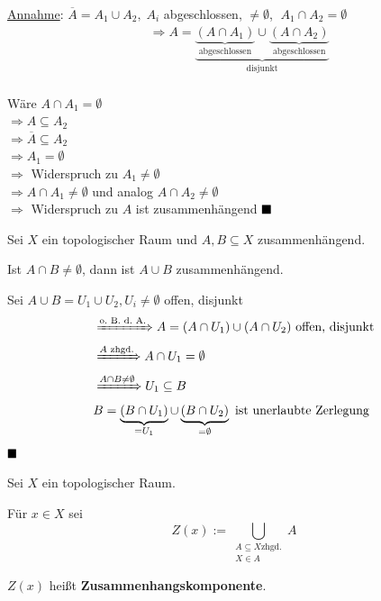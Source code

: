 \begin{beweis}
    \underline{Annahme}: $\overline{A} = A_1 \cup A_2,\; A_i$ abgeschlossen, $\neq \emptyset$,
    $\;A_1 \cap A_2 = \emptyset$
    \begin{align*}
        &\Rightarrow A = \underbrace{\underbrace{(A \cap A_1)}_\text{abgeschlossen} \cup \underbrace{(A \cap A_2)}_\text{abgeschlossen}}_\text{disjunkt}\\
    \end{align*}

    Wäre $A \cap A_1 = \emptyset$\\
    $\Rightarrow A \subseteq A_2$\\
    $\Rightarrow \overline{A} \subseteq A_2$\\
    $\Rightarrow A_1 = \emptyset$\\
    $\Rightarrow$ Widerspruch zu $A_1 \neq \emptyset$\\
    $\Rightarrow A \cap A_1 \neq \emptyset$ und analog 
                $A \cap A_2 \neq \emptyset$\\
    $\Rightarrow$ Widerspruch zu $A$ ist zusammenhängend $ \qed$
\end{beweis}

\begin{bemerkung}\label{bem:zusammenhangVereinigung}
    Sei $X$ ein topologischer Raum und $A, B \subseteq X$ zusammenhängend.

    Ist $A \cap B \neq \emptyset$, dann ist $A \cup B$ zusammenhängend.
\end{bemerkung}

\begin{beweis}
    Sei $A \cup B = U_1 \cup U_2, U_i \neq \emptyset$ offen, disjunkt
    \begin{align*}
        &\xRightarrow{\text{o.~B.~d.~A.}} A = (A \cap U_1) \cup (A \cap U_2) \text{ offen, disjunkt}\\
        &\xRightarrow{A \text{ zhgd.}} A \cap U_1 = \emptyset\\
        &\xRightarrow{A \cap B \neq \emptyset} U_1 \subseteq B\\
        &B = \underbrace{(B \cap U_1)}_{= U_1} \cup \underbrace{(B \cap U_2)}_{= \emptyset} \text{ ist unerlaubte Zerlegung}
    \end{align*}
    $\qed$
\end{beweis}

\begin{definition}
    Sei $X$ ein topologischer Raum.
    
    Für $x \in X$ sei 
    \[Z(x) := \bigcup_{\substack{A \subseteq X \text{zhgd.}\\ X \in A}} A\]

     $Z(x)$ heißt \textbf{Zusammenhangskomponente}.
\end{definition}

